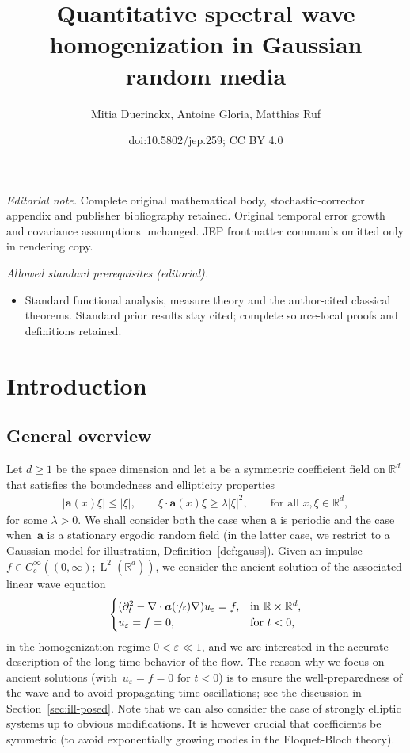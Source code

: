 \documentclass[10pt]{amsart}
\title{Quantitative spectral wave homogenization in Gaussian random media}
\author{Mitia Duerinckx, Antoine Gloria, Matthias Ruf}
\date{doi:10.5802/jep.259; CC BY 4.0}
\theoremstyle{plain}
\theoremstyle{definition}
\numberwithin{equation}{section}
\newcommand{\e}{\varepsilon}
\newcommand{\R}{\mathbb R}
\newcommand{\Aa}{\boldsymbol a}
\newcommand{\Ld}{\operatorname{L}}
\begin{document}
\maketitle
\noindent\textit{Editorial note.} Complete original mathematical body, stochastic-corrector appendix and publisher bibliography retained. Original temporal error growth and covariance assumptions unchanged. JEP frontmatter commands omitted only in rendering copy.\par\medskip
\noindent\textit{Allowed standard prerequisites (editorial).}\begin{itemize}
\item Standard functional analysis, measure theory and the author-cited classical theorems. Standard prior results stay cited; complete source-local proofs and definitions retained.
\end{itemize}\medskip
\vspace*{-\baselineskip}
\tableofcontents


\section{Introduction}

\subsection{General overview}
Let $d\ge1$ be the space dimension and let $\Aa$ be a symmetric coefficient field on $\R^d$ that satisfies the boundedness and ellipticity properties
\begin{align}\label{eq:unif-ell}
|\Aa(x)\xi|\le|\xi|,\qquad\xi\cdot\Aa(x)\xi\ge\lambda|\xi|^2,\qquad\text{for all $x,\xi\in\R^d$},
\end{align}
for some $\lambda>0$.
We shall consider both the case when $\Aa$ is periodic and the case when~$\Aa$ is a stationary ergodic random field (in the latter case, we restrict to a Gaussian model for illustration, \cf Definition~\ref{def:gauss}).
Given an impulse
$f\in C^\infty_c((0,\infty);\Ld^2(\R^d))$,
we consider the ancient solution of the associated linear wave equation
\begin{equation}\label{eq:hyperb}
\begin{cases}
(\partial_t^2-\nabla\cdot\Aa(\sfrac\cdot\e)\nabla)u_\e=f,&\text{in $\R\times\R^d$},\\
u_\e=f=0,&\text{for $t<0$,}
\end{cases}
\end{equation}
in the homogenization regime $0<\e \ll 1$, and we are interested in the accurate description of the long-time behavior of the flow. The reason why we focus on ancient solutions (with~$u_\e=f=0$ for $t<0$) is to ensure the well-preparedness of the wave and to avoid propagating time oscillations; see {the} discussion in Section~\ref{sec:ill-posed}.
{Note that we can also consider the case of strongly elliptic systems up to obvious modifications. It is however crucial that coefficients be symmetric (to avoid exponentially growing modes in the Floquet-Bloch theory).}
\end{document}
